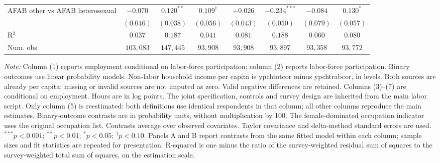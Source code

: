 \begin{table}[htpb!]
{\begin{tabular}{l c c c c c c c}
AFAB other vs AFAB heterosexual & $-0.070$ & $0.120^{**}$ & $0.109^{\dagger}$ & $-0.026$ & $-0.234^{***}$ & $-0.084$ & $0.130^{*}$ \\
 & $(0.046)$ & $(0.038)$ & $(0.056)$ & $(0.043)$ & $(0.050)$ & $(0.079)$ & $(0.057)$ \\
\hline
R$^2$ & $0.037$ & $0.187$ & $0.041$ & $0.081$ & $0.188$ & $0.060$ & $0.080$ \\
Num. obs. & $103,083$ & $147,445$ & $93,908$ & $93,908$ & $93,897$ & $93,358$ & $93,772$ \\
\hline
\end{tabular}%
}
\par\vspace{1ex}
\begin{minipage}{\textwidth}\footnotesize\raggedright
\textit{Note:} Column (1) reports employment conditional on labor-force participation; column (2) reports labor-force participation. Binary outcomes use linear probability models. Non-labor household income per capita is ypchtotcor minus ypchtrabcor, in levels. Both sources are already per capita; missing or invalid sources are not imputed as zero. Valid negative differences are retained.  Columns (3)--(7) are conditional on employment. Hours are in log points. The joint specification, controls and survey design are inherited from the main labor script. Only column (5) is reestimated: both definitions use identical respondents in that column; all other columns reproduce the main estimates. Binary-outcome contrasts are in probability units, without multiplication by 100. The female-dominated occupation indicator uses the original occupation list. Contrasts average over observed covariates. Taylor covariance and delta-method standard errors are used. $^{***}p<0.001$; $^{**}p<0.01$; $^{*}p<0.05$; $^{\dagger}p<0.10$. Panels A and B report contrasts from the same fitted model within each column; sample sizes and fit statistics are repeated for presentation. R-squared is one minus the ratio of the survey-weighted residual sum of squares to the survey-weighted total sum of squares, on the estimation scale.
\end{minipage}
\end{table}
